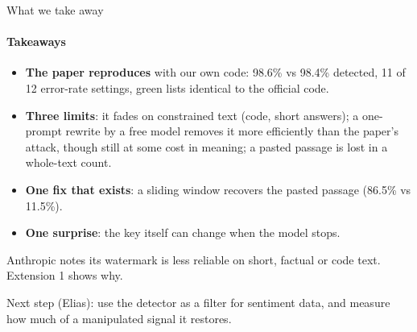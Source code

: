 \documentclass[aspectratio=169,10pt,t]{beamer}
\newcommand{\key}[1]{\textcolor{calblue}{\textbf{#1}}}
\newcommand{\quiet}[1]{\textcolor{muted}{#1}}
\begin{document}
\begin{frame}{What we take away}
  \framesubtitle{Takeaways}
  \begin{itemize}
    \item \key{The paper reproduces} with our own code: 98.6\% vs 98.4\% detected, 11 of 12 error-rate settings, green lists identical to the official code.
    \item \key{Three limits}: it fades on constrained text (code, short answers); a one-prompt rewrite by a free model removes it more efficiently than the paper's attack, though still at some cost in meaning; a pasted passage is lost in a whole-text count.
    \item \key{One fix that exists}: a sliding window recovers the pasted passage (86.5\% vs 11.5\%).
    \item \key{One surprise}: the key itself can change when the model stops.
  \end{itemize}
  \vspace{0.3em}
  \begin{goldbox}
    Anthropic notes its watermark is less reliable on short, factual or code text. Extension 1 shows why.
  \end{goldbox}
  \vspace{0.2em}
  \quiet{\small Next step (Elias): use the detector as a filter for sentiment data, and measure how much of a manipulated signal it restores.}
\end{frame}

\appendix
\end{document}
